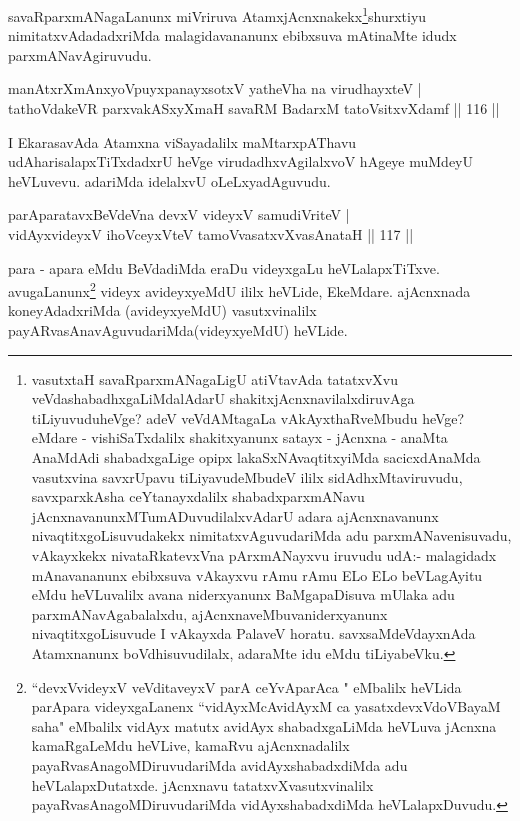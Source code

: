\begin{artha}
savaRparxmANagaLanunx miVriruva AtamxjAcnxnakekx\footnote{vasutxtaH savaRparxmANagaLigU atiVtavAda tatatxvXvu veVdashabadhxgaLiMdalAdarU shakitxjAcnxnavilalxdiruvAga tiLiyuvuduheVge? adeV veVdAMtagaLa vAkAyxthaRveMbudu heVge? eMdare - vishiSaTxdalilx shakitxyanunx satayx - jAcnxna - anaMta AnaMdAdi shabadxgaLige opipx lakaSxNAvaqtitxyiMda sacicxdAnaMda vasutxvina savxrUpavu tiLiyavudeMbudeV ililx sidAdhxMtaviruvudu, savxparxkAsha ceYtanayxdalilx shabadxparxmANavu jAcnxnavanunxMTumADuvudilalxvAdarU adara ajAcnxnavanunx nivaqtitxgoLisuvudakekx nimitatxvAguvudariMda adu parxmANavenisuvadu, vAkayxkekx nivataRkatevxVna pArxmANayxvu iruvudu udA:- malagidadx mAnavananunx ebibxsuva vAkayxvu rAmu rAmu ELo ELo beVLagAyitu eMdu heVLuvalilx avana niderxyanunx BaMgapaDisuva mUlaka adu parxmANavAgabalalxdu, ajAcnxnaveMbuvaniderxyanunx nivaqtitxgoLisuvude I vAkayxda PalaveV horatu. savxsaMdeVdayxnAda Atamxnanunx boVdhisuvudilalx, adaraMte idu eMdu tiLiyabeVku.}shurxtiyu nimitatxvAdadadxriMda 
malagidavananunx ebibxsuva mAtinaMte idudx parxmANavAgiruvudu.
\end{artha}

\begin{shl}
manAtxrXmAnxyoV\s puyxpanayxsotxV yatheVha na virudhayxteV |\\
tathoVdakeVR parxvakASxyXmaH savaRM BadarxM tatoV\s sitxvXdamf \hfill || 116 ||
\end{shl}

\begin{artha}
I EkarasavAda Atamxna viSayadalilx maMtarxpAThavu udAharisalapxTiTxdadxrU heVge virudadhxvAgilalxvoV hAgeye muMdeyU heVLuvevu. adariMda idelalxvU oLeLxyadAguvudu.
\end{artha}

\begin{shl}
parAparatavxBeVdeVna devxV videyxV samudiVriteV |\\
vidAyxvideyxV ihoVceyxVteV tamoVvasatxvXvasAnataH \hfill || 117 ||
\end{shl}

\begin{artha}
para - apara eMdu BeVdadiMda eraDu videyxgaLu heVLalapxTiTxve.  avugaLanunx\footnote{``devxVvideyxV veVditaveyxV parA ceYvAparAca " eMbalilx heVLida parApara videyxgaLanenx ``vidAyxMcAvidAyxM ca yasatxdevxVdoVBayaM saha" eMbalilx vidAyx matutx avidAyx shabadxgaLiMda heVLuva jAcnxna kamaRgaLeMdu heVLive, kamaRvu ajAcnxnadalilx payaRvasAnagoMDiruvudariMda avidAyxshabadxdiMda adu heVLalapxDutatxde. jAcnxnavu tatatxvXvasutxvinalilx payaRvasAnagoMDiruvudariMda vidAyxshabadxdiMda heVLalapxDuvudu.} videyx avideyxyeMdU ililx heVLide, EkeMdare. ajAcnxnada koneyAdadxriMda (avideyxyeMdU) vasutxvinalilx payARvasAnavAguvudariMda(videyxyeMdU) heVLide.
\end{artha}


